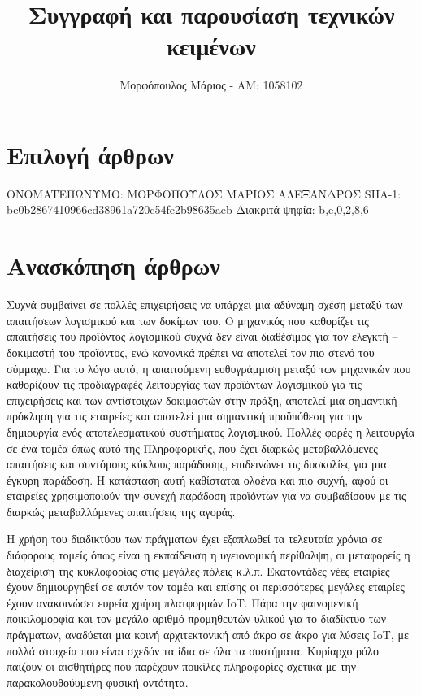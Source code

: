 \documentclass[11pt,a4paper,twoside,english,greek]{article}
\begin{document}
\title{Συγγραφή και παρουσίαση τεχνικών κειμένων}
\author{{\LARGE Μορφόπουλος Μάριος - AM: 1058102}}
\maketitle


\newpage
\section*{Επιλογή άρθρων}
\vspace{12mm}
{\Large {ONOMATEΠΩΝΥΜΟ: ΜΟΡΦΟΠΟΥΛΟΣ ΜΑΡΙΟΣ ΑΛΕΞΑΝΔΡΟΣ
\newline \newline {}	SHA-1: be0b2867410966cd38961a720c54fe2b98635aeb 
\newline
\newline \newline {} Διακριτά ψηφία:   b,e,0,2,8,6 \newline \newline
}

\section*{Ανασκόπηση άρθρων}
\vspace{3 mm}
\setlength{\parindent}{1cm} Συχνά συμβαίνει σε πολλές επιχειρήσεις να υπάρχει μια αδύναμη σχέση μεταξύ των απαιτήσεων λογισμικού και των δοκίμων του. Ο μηχανικός που καθορίζει τις απαιτήσεις του προϊόντος λογισμικού συχνά δεν είναι διαθέσιμος για τον ελεγκτή – δοκιμαστή του προϊόντος, ενώ κανονικά πρέπει να αποτελεί τον πιο στενό του σύμμαχο. Για το λόγο αυτό, η απαιτούμενη ευθυγράμμιση μεταξύ των μηχανικών που καθορίζουν τις προδιαγραφές λειτουργίας των προϊόντων λογισμικού για τις επιχειρήσεις και των αντίστοιχων δοκιμαστών στην πράξη, αποτελεί μια σημαντική πρόκληση για τις εταιρείες και αποτελεί μια σημαντική προϋπόθεση για την δημιουργία ενός αποτελεσματικού συστήματος λογισμικού.
Πολλές φορές η λειτουργία σε ένα τομέα όπως αυτό της Πληροφορικής, που έχει διαρκώς μεταβαλλόμενες απαιτήσεις και συντόμους κύκλους παράδοσης, επιδεινώνει τις δυσκολίες για μια έγκυρη παράδοση. Η  κατάσταση αυτή καθίσταται ολοένα και πιο συχνή, αφού οι εταιρείες χρησιμοποιούν την συνεχή παράδοση προϊόντων  για να συμβαδίσουν με τις διαρκώς μεταβαλλόμενες απαιτήσεις της αγοράς.
 
\setlength{\parindent}{1cm} Η χρήση του διαδικτύου των πράγματων έχει εξαπλωθεί τα τελευταία χρόνια σε διάφορους τομείς όπως είναι η εκπαίδευση η υγειονομική περίθαλψη, οι μεταφορείς η διαχείριση της κυκλοφορίας στις μεγάλες πόλεις κ.λ.π. Εκατοντάδες νέες εταιρίες έχουν δημιουργηθεί σε αυτόν τον τομέα και επίσης οι περισσότερες μεγάλες εταιρίες έχουν ανακοινώσει ευρεία χρήση πλατφορμών IoT. Πάρα την φαινομενική ποικιλομορφία και τον μεγάλο αριθμό προμηθευτών υλικού για το διαδίκτυο των πράγματων, αναδύεται μια κοινή αρχιτεκτονική από άκρο σε άκρο για λύσεις IoT, με πολλά στοιχεία που είναι σχεδόν τα ίδια  σε όλα τα συστήματα. Κυρίαρχο ρόλο παίζουν οι αισθητήρες που παρέχουν ποικίλες πληροφορίες σχετικά με την παρακολουθούυμενη φυσική οντότητα.

}
\end{document}
